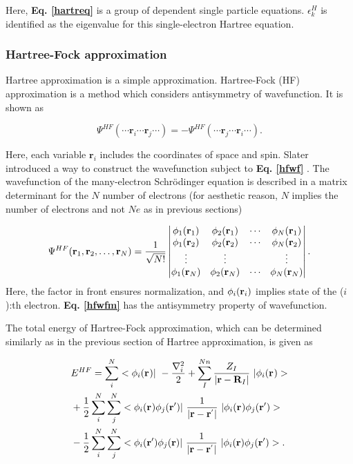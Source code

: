 \documentclass[a4paper, 12pt, titlepage,oneside,drop]{kthesis}
\begin{document}
Here, \textbf{Eq. \ref{hartreq}} is a group of dependent single particle equations. $\epsilon_k^{{H}}$ is identified as the eigenvalue for this single-electron Hartree equation.

\subsubsection{Hartree-Fock approximation}
Hartree approximation is a simple approximation. Hartree-Fock (HF) approximation is a method which considers antisymmetry of wavefunction. It is shown as

\begin{equation}\label{hfwf}
\Psi^{HF} ( \cdots \textbf{r}_{i} \cdots  \textbf{r}_{j} \cdots ) = - \Psi^{HF} ( \cdots \textbf{r}_{j} \cdots  \textbf{r}_{i} \cdots).
\end{equation}

Here, each variable ${\textbf{r}_{{i}}}$ includes the coordinates of space and spin. Slater introduced a way to construct the wavefunction subject to \textbf{Eq. \ref{hfwf}} \cite{slater1951simplification}. The wavefunction of the many-electron 
Schrödinger equation is described in a matrix determinant for the $N$ number of electrons (for aesthetic reason, $N$ implies the number of electrons and not $Ne$ as in previous sections)

\begin{equation}\label{hfwfm}
\Psi^{HF}(\textbf{r}_1, \textbf{r}_2, \ldots, \textbf{r}_N) =
\frac{1}{\sqrt{N!}} \left|
\begin{matrix}
    \bwff<1><1> & \bwff<2><1> & \cdots & \bwff<N><1> \\
    \bwff<1><2> & \bwff<2><2> & \cdots & \bwff<N><2> \\
    \vdots               & \vdots               &        & \vdots               \\
    \bwff<1><N> & \bwff<2><N> & \cdots & \bwff<N><N>
\end{matrix} \right|.
\end{equation}
\noindent Here, the factor in front ensures normalization, and $\bwff<i><i>$ implies state of the ($i$):th electron. \textbf{Eq. \ref{hfwfm}} has the antisymmetry property of wavefunction.

The total energy of Hartree-Fock approximation, which can be determined similarly as in the previous section of Hartree approximation, is given as

\begin{equation}\begin{split}
&E^{HF} = \sum\limits_i^{{N}} <\bwff<i><> |\ -\frac{\nabla^{2}_{i}}{2} + \sum\limits_I^{{Nn}} \frac{Z_{I}}{|\textbf{r}-\textbf{R}_{I}|}  \ | \bwff<i><> > \\
& + \frac{1}{2} \sum\limits_i^{{N}} \sum\limits_j^{{N}} <\bwff<i><> \bwfn<j><'>|\ \frac{1}{|\textbf{r} - \textbf{r}^{'} |} \ | \bwff<i><> \bwfn<j><'>> \\
& - \frac{1}{2} \sum\limits_i^{{N}} \sum\limits_j^{{N}} <\bwfn<i><'> \bwfn<j><>|\ \frac{1}{|\textbf{r} - \textbf{r}^{'} |} \ | \bwfn<i><> \bwfn<j><'>>.
\end{split}\end{equation}
\end{document}
